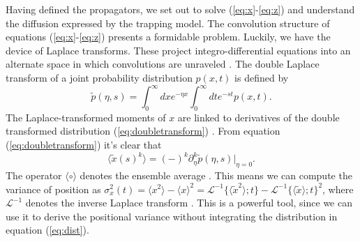 \documentclass[draft,grl]{agujournal2018}
\newcommand\be{\begin{equation}}
\newcommand\ee{\end{equation}}
\newcommand\bra{\langle}
\newcommand\ket{\rangle}
\newcommand\El{\mathcal{L}}
\begin{document}
Having defined the propagators, we set out to solve (\ref{eq:x}-\ref{eq:z}) and understand the diffusion expressed by the trapping model.
The convolution structure  of equations (\ref{eq:x}-\ref{eq:z}) presents a formidable problem.
Luckily, we have the device of Laplace transforms.
These project integro-differential equations into an alternate space in which convolutions are unraveled \citep[e.g.,][]{Arfken1985}.
The double Laplace transform of a joint probability distribution $p(x,t)$ is defined by 
\be \tilde{p}(\eta,s) = \int_0^\infty dx e^{-\eta x}\int_0^\infty dt e^{-st} p(x,t). \label{eq:doubletransform}\ee
The Laplace-transformed moments of $x$ are linked to derivatives of the double transformed distribution (\ref{eq:doubletransform}) \citep[cf.,][]{Berezhkovskii2002}.
From equation (\ref{eq:doubletransform}) it's clear that
\be \bra \tilde{x}(s)^k \ket = (-)^k\partial_\eta^k \tilde{p}(\eta,s)\Big|_{\eta=0}.\label{eq:momenttrick}\ee
The operator $\bra \circ \ket$ denotes the ensemble average \citep[e.g.,][]{Kittel1958}.
This means we can compute the variance of position as $\sigma_x^2(t) = \bra x^2 \ket - \bra x \ket^2 = \El^{-1} \{\bra\tilde{x}^2 \ket;t\} - \El^{-1} \{\bra\tilde{x} \ket;t\}^2$, where $\El^{-1}$ denotes the inverse Laplace transform \citep[e.g.,][]{Arfken1985}. This is a powerful tool, since we can use it to derive the positional variance without integrating the distribution in equation (\ref{eq:dist}).
\end{document}
